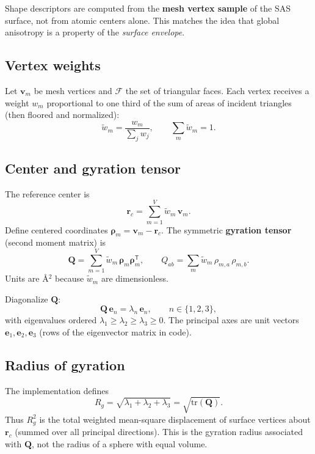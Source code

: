 \documentclass[11pt,a4paper]{article}
\begin{document}
Shape descriptors are computed from the \textbf{mesh vertex sample} of the SAS
surface, not from atomic centers alone. This matches the idea that global
anisotropy is a property of the \emph{surface envelope}.

\subsection{Vertex weights}

Let $\mathbf{v}_m$ be mesh vertices and $\mathcal{F}$ the set of triangular faces.
Each vertex receives a weight $w_m$ proportional to one third of the sum of areas of
incident triangles (then floored and normalized):
\begin{equation}
  \tilde{w}_m = \frac{w_m}{\sum_j w_j}, \qquad \sum_m \tilde{w}_m = 1.
\end{equation}

\subsection{Center and gyration tensor}

The reference center is
\begin{equation}
  \mathbf{r}_c = \sum_{m=1}^{V} \tilde{w}_m\, \mathbf{v}_m.
\end{equation}
Define centered coordinates $\boldsymbol{\rho}_m = \mathbf{v}_m - \mathbf{r}_c$.
The symmetric \textbf{gyration tensor} (second moment matrix) is
\begin{equation}
  \mathbf{Q}
  = \sum_{m=1}^{V} \tilde{w}_m\, \boldsymbol{\rho}_m \boldsymbol{\rho}_m^{\mathsf{T}},
  \qquad Q_{ab} = \sum_m \tilde{w}_m\, \rho_{m,a}\,\rho_{m,b}.
  \label{eq:gyration}
\end{equation}
Units are {\AA}$^2$ because $\tilde{w}_m$ are dimensionless.

Diagonalize $\mathbf{Q}$:
\begin{equation}
  \mathbf{Q}\,\mathbf{e}_n = \lambda_n\,\mathbf{e}_n,
  \qquad n\in\{1,2,3\},
\end{equation}
with eigenvalues ordered $\lambda_1\ge\lambda_2\ge\lambda_3\ge 0$.
The principal axes are unit vectors $\mathbf{e}_1,\mathbf{e}_2,\mathbf{e}_3$ (rows of
the eigenvector matrix in code).

\subsection{Radius of gyration}

The implementation defines
\begin{equation}
  \boxed{
    R_g = \sqrt{\lambda_1+\lambda_2+\lambda_3}
        = \sqrt{\mathrm{tr}(\mathbf{Q})}.
  }
  \label{eq:Rg}
\end{equation}
Thus $R_g^2$ is the total weighted mean-square displacement of surface vertices about
$\mathbf{r}_c$ (summed over all principal directions). This is the gyration radius
associated with $\mathbf{Q}$, not the radius of a sphere with equal volume.
\end{document}

